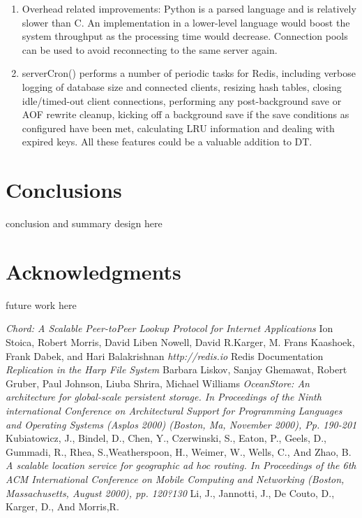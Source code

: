 \documentclass[10pt,twocolumn,letterpaper]{article}
\begin{document}
\begin{enumerate}
\item Overhead related improvements: Python is a parsed language and is relatively slower than C. An implementation in a lower-level language would boost the system throughput as the processing time would decrease. Connection pools can be used to avoid reconnecting to the same server again.

\item serverCron() performs a number of periodic tasks for Redis, including verbose logging of database size and connected clients, resizing hash tables, closing idle/timed-out client connections, performing any post-background save or AOF rewrite cleanup, kicking off a background save if the save conditions as configured have been met, calculating LRU information and dealing with expired keys. All these features could be a valuable addition to DT. 
\end{enumerate}

\section{Conclusions} \label{conclusions}
conclusion and summary design here

\section{Acknowledgments} \label{acknowledgments}
future work here

\begin{thebibliography}{9}
 \emph{Chord: A Scalable Peer-toPeer Lookup Protocol for Internet Applications}  Ion Stoica, Robert Morris, David Liben Nowell, David R.Karger, M. Frans Kaashoek, Frank Dabek, and Hari Balakrishnan
 \emph{http://redis.io} Redis Documentation
 \emph{Replication in the Harp File System}  Barbara Liskov, Sanjay Ghemawat, Robert Gruber, Paul Johnson, Liuba Shrira, Michael Williams
 \emph{OceanStore: An architecture for global-scale persistent storage. In Proceedings of the Ninth international Conference on Architectural Support for Programming Languages and Operating Systems (Asplos 2000) (Boston, Ma, November 2000), Pp. 190-201} Kubiatowicz, J., Bindel, D., Chen, Y., Czerwinski, S.,
Eaton, P., Geels, D., Gummadi, R., Rhea, S.,Weatherspoon, H., Weimer, W., Wells, C., And Zhao, B.
 \emph{A scalable location service for geographic ad hoc routing. In Proceedings of the 6th ACM International Conference on Mobile Computing and Networking (Boston, Massachusetts, August 2000), pp. 120?130} Li, J., Jannotti, J., De Couto, D., Karger, D., And Morris,R.
\end{thebibliography}
{\small


} 
\end{document}
